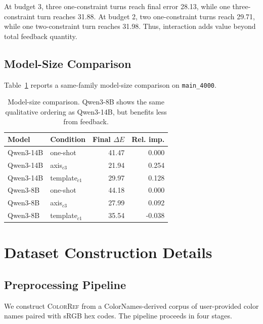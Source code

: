 \documentclass[11pt]{article}
\begin{document}
At budget 3, three one-constraint turns reach final error 28.13, while one
three-constraint turn reaches 31.88. At budget 2, two one-constraint turns
reach 29.71, while one two-constraint turn reaches 31.98. Thus, interaction
adds value beyond total feedback quantity.

\subsection{Model-Size Comparison}
\label{ap:model-size}

Table~\ref{tab:appendix-model-size} reports a same-family model-size
comparison on \texttt{main\_4000}.

\begin{table}[h]
\centering
\small
\begin{tabular}{@{}llrr@{}}
\toprule
Model & Condition & Final $\Delta E$ & Rel. imp. \\
\midrule
Qwen3-14B & one-shot & 41.47 & 0.000 \\
Qwen3-14B & axis$_{c3}$ & 21.94 & 0.254 \\
Qwen3-14B & template$_{c1}$ & 29.97 & 0.128 \\
Qwen3-8B & one-shot & 44.18 & 0.000 \\
Qwen3-8B & axis$_{c3}$ & 27.99 & 0.092 \\
Qwen3-8B & template$_{c1}$ & 35.54 & -0.038 \\
\bottomrule
\end{tabular}
\caption{
Model-size comparison. Qwen3-8B shows the same qualitative ordering as
Qwen3-14B, but benefits less from feedback.
}
\label{tab:appendix-model-size}
\end{table}

\section{Dataset Construction Details}
\label{sec:appendix-dataset}

\subsection{Preprocessing Pipeline}
\label{ap:prepro}

We construct \textsc{ColorRef} from a ColorNames-derived corpus of
user-provided color names paired with sRGB hex codes. The pipeline proceeds
in four stages.
\end{document}
